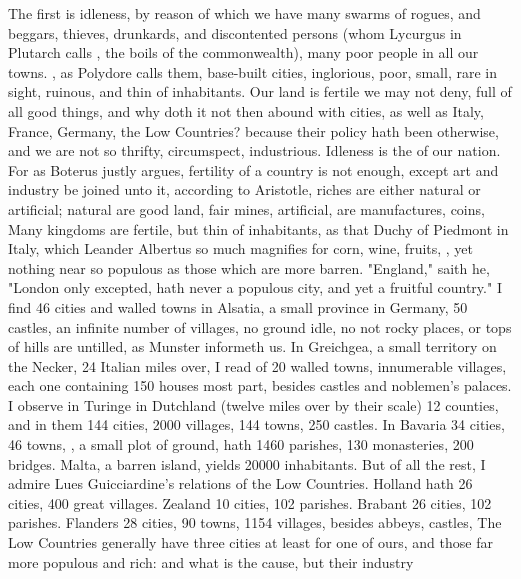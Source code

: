 The first is idleness, by reason of which we have many swarms of rogues, and
beggars, thieves, drunkards, and discontented persons (whom Lycurgus in
Plutarch calls , the boils of the commonwealth), many
poor people in all our towns. , as
Polydore calls them, base-built cities, inglorious, poor,
small, rare in sight, ruinous, and thin of inhabitants. Our land is fertile we
may not deny, full of all good things, and why doth it not then abound with
cities, as well as Italy, France, Germany, the Low Countries? because their
policy hath been otherwise, and we are not so thrifty, circumspect,
industrious. Idleness is the  of our nation. For as
Boterus justly argues, fertility of a country is not
enough, except art and industry be joined unto it, according to Aristotle,
riches are either natural or artificial; natural are good land, fair mines,
\etc{} artificial, are manufactures, coins, \etc{} Many kingdoms are fertile,
but thin of inhabitants, as that Duchy of Piedmont in Italy, which Leander
Albertus so much magnifies for corn, wine, fruits, \etc{}, yet nothing near so
populous as those which are more barren. "England," saith
he, "London only excepted, hath never a populous city, and yet a fruitful
country." I find 46 cities and walled towns in Alsatia, a small province in
Germany, 50 castles, an infinite number of villages, no ground idle, no not
rocky places, or tops of hills are untilled, as Munster
informeth us. In Greichgea, a small territory on the
Necker, 24 Italian miles over, I read of 20 walled towns, innumerable villages,
each one containing 150 houses most part, besides castles and noblemen's
palaces. I observe in Turinge in Dutchland (twelve miles
over by their scale) 12 counties, and in them 144 cities, 2000 villages, 144
towns, 250 castles. In Bavaria 34 cities, 46 towns, \etc{}
, a small plot of ground, hath
1460 parishes, 130 monasteries, 200 bridges. Malta, a barren island, yields
20\thinspace{}000 inhabitants. But of all the rest, I admire Lues
Guicciardine's relations of the Low Countries. Holland hath 26 cities, 400
great villages. Zealand 10 cities, 102 parishes. Brabant 26 cities, 102
parishes. Flanders 28 cities, 90 towns, 1154 villages, besides abbeys, castles,
\etc{} The Low Countries generally have three cities at least for one of ours,
and those far more populous and rich: and what is the cause, but their industry
